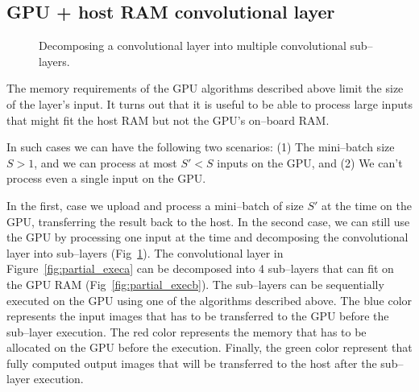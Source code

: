 \documentclass[conference]{./IEEEtran/IEEEtran}
\begin{document}
\subsection{GPU + host RAM convolutional layer}

  \begin{figure}
    \centering
    \caption{Decomposing a convolutional layer into multiple
      convolutional sub--layers.}
    \label{fig:partial_exec}
  \end{figure}

  The memory requirements of the GPU algorithms described above limit
  the size of the layer's input.  It turns out that it is useful to be
  able to process large inputs that might fit the host RAM but not the
  GPU's on--board RAM.

  In such cases we can have the following two scenarios: (1) The
  mini--batch size $S > 1$, and we can process at most $S' < S$ inputs
  on the GPU, and (2) We can't process even a single input on the GPU.

  In the first, case we upload and process a mini--batch of size $S'$
  at the time on the GPU, transferring the result back to the host.
  In the second case, we can still use the GPU by processing one input
  at the time and decomposing the convolutional layer into sub--layers
  (Fig~\ref{fig:partial_exec}). The convolutional layer in
  Figure~\ref{fig:partial_execa} can be decomposed into 4 sub--layers
  that can fit on the GPU RAM (Fig~\ref{fig:partial_execb}). The
  sub--layers can be sequentially executed on the GPU using one of the
  algorithms described above.  The blue color represents the input
  images that has to be transferred to the GPU before the sub--layer
  execution.  The red color represents the memory that has to be
  allocated on the GPU before the execution.  Finally, the green color
  represent that fully computed output images that will be transferred
  to the host after the sub--layer execution.
\end{document}
